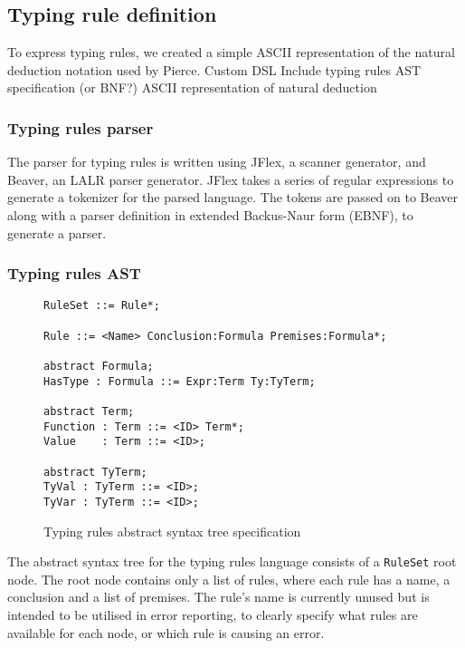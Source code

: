 \documentclass[nofilelist]{cslthse-msc}
\newcommand{\CR}[1]{\textcolor{green!60!black}{[\textbf{CR}:#1]}}
\begin{document}
\subsection{Typing rule definition}\label{typingruledefinition}
To express typing rules, we created a simple ASCII representation of the natural deduction notation used by Pierce\cite{Pierce}.
Custom DSL
Include typing rules AST specification (or BNF?)
ASCII representation of natural deduction %


\subsubsection{Typing rules parser}\label{typingrulesparser}
The parser for typing rules is written using JFlex\cite{jflex}, a scanner generator, and Beaver\cite{beaver}, an LALR parser generator.
JFlex takes a series of regular expressions to generate a tokenizer for the parsed language.
The tokens are passed on to Beaver along with a parser definition in extended Backus-Naur form (EBNF), to generate a parser.


\subsubsection{Typing rules AST}\label{typingrulesast}
\begin{figure}[h]
\begin{lstlisting}[]
RuleSet ::= Rule*;

Rule ::= <Name> Conclusion:Formula Premises:Formula*;

abstract Formula;
HasType : Formula ::= Expr:Term Ty:TyTerm;

abstract Term;
Function : Term ::= <ID> Term*;
Value    : Term ::= <ID>;

abstract TyTerm;
TyVal : TyTerm ::= <ID>;
TyVar : TyTerm ::= <ID>;
\end{lstlisting}
  \caption{Typing rules abstract syntax tree specification}
  \label{trastspec}
\end{figure}

The abstract syntax tree for the typing rules language consists of a \lstinline{RuleSet} root node.
The root node contains only a list of rules, where each rule has a name, a conclusion and a list of premises.
The rule's name is currently unused but is intended to be utilised in error reporting, to clearly specify what rules are available for each node, or which rule is causing an error.
\end{document}
